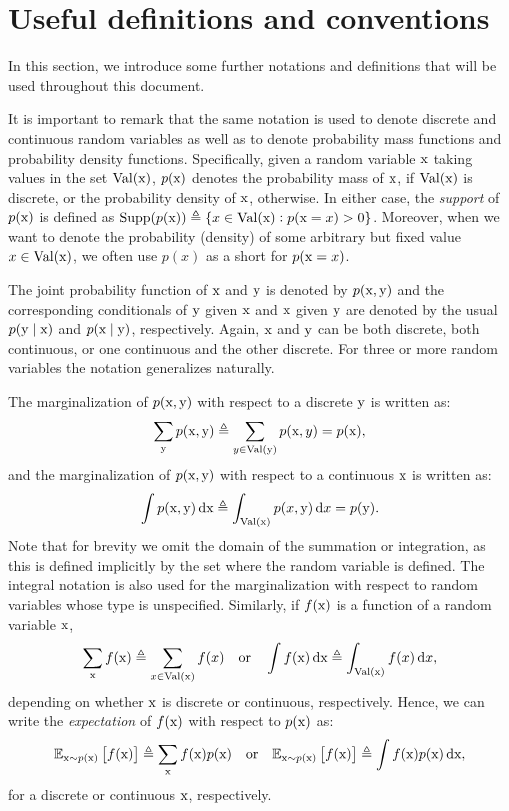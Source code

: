 \section{Useful definitions and conventions}
\label{sec:definitions}
In this section, we introduce some further notations and definitions that will be used throughout this document.

It is important to remark that the same notation is used to denote discrete and continuous random variables as well as to denote probability mass functions and probability density functions. Specifically, given a random variable ${\textnormal{x}}$ taking values in the set $\mathrm{Val}({\textnormal{x}})$, $p({\textnormal{x}})$ denotes the probability mass of ${\textnormal{x}}$, if $\mathrm{Val}({\textnormal{x}})$ is discrete, or the probability density of ${\textnormal{x}}$, otherwise. In either case, the \emph{support} of $p({\textnormal{x}})$ is defined as $\mathrm{Supp}(p({\textnormal{x}})) \triangleq \lbrace x \in \mathrm{Val}({\textnormal{x}}): p({\textnormal{x}}=x) > 0 \rbrace$. Moreover, when we want to denote the probability (density) of some arbitrary but fixed value $x \in \mathrm{Val}({\textnormal{x}})$, we often use $p(x)$ as a short for $p({\textnormal{x}}=x)$.

The joint probability function of ${\textnormal{x}}$ and ${\textnormal{y}}$ is denoted by $p({\textnormal{x}},{\textnormal{y}})$ and the corresponding conditionals of ${\textnormal{y}}$ given ${\textnormal{x}}$ and ${\textnormal{x}}$ given ${\textnormal{y}}$ are denoted by the usual $p({\textnormal{y}} \mid {\textnormal{x}})$ and $p({\textnormal{x}} \mid {\textnormal{y}})$, respectively. Again, ${\textnormal{x}}$ and ${\textnormal{y}}$ can be both discrete, both continuous, or one continuous and the other discrete. For three or more random variables the notation generalizes naturally.

The marginalization of $p({\textnormal{x}},{\textnormal{y}})$ with respect to a discrete ${\textnormal{y}}$ is written as:
\begin{equation}
    \sum_{{\textnormal{y}}} p({\textnormal{x}},{\textnormal{y}}) \triangleq \sum_{y \in \mathrm{Val}({\textnormal{y}})} p({\textnormal{x}},y) = p({\textnormal{x}}),
\end{equation}
and the marginalization of $p({\textnormal{x}},{\textnormal{y}})$ with respect to a continuous ${\textnormal{x}}$ is written as:
\begin{equation}
    \int p({\textnormal{x}},{\textnormal{y}}) {\,\text{d}} {\textnormal{x}} \triangleq \int_{\mathrm{Val}({\textnormal{x}})} p(x,{\textnormal{y}}) {\,\text{d}} x = p({\textnormal{y}}).
\end{equation}
Note that for brevity we omit the domain of the summation or integration, as this is defined implicitly by the set where the random variable is defined. The integral notation is also used for the marginalization with respect to random variables whose type is unspecified. Similarly, if $f({\textnormal{x}})$ is a function of a random variable ${\textnormal{x}}$,
\begin{equation}
    \sum_{\textnormal{x}} f({\textnormal{x}}) \triangleq \sum_{x \in \mathrm{Val}({\textnormal{x}})} f(x) \quad \text{or} \quad \int f({\textnormal{x}}) {\,\text{d}} {\textnormal{x}} \triangleq \int_{\mathrm{Val}({\textnormal{x}})} f(x) {\,\text{d}} x,
\end{equation}
depending on whether ${\textnormal{x}}$ is discrete or continuous, respectively. Hence, we can write the \emph{expectation} of $f({\textnormal{x}})$ with respect to $p({\textnormal{x}})$ as:
\begin{equation}
    \mathbb{E}_{{\textnormal{x}} \sim p({\textnormal{x}})} \left[f({\textnormal{x}})\right] \triangleq \sum_{\textnormal{x}} f({\textnormal{x}}) p({\textnormal{x}}) \quad \text{or} \quad \mathbb{E}_{{\textnormal{x}} \sim p({\textnormal{x}})} \left[f({\textnormal{x}})\right] \triangleq \int f({\textnormal{x}}) p({\textnormal{x}}) {\,\text{d}} {\textnormal{x}},
\end{equation}
for a discrete or continuous ${\textnormal{x}}$, respectively.

